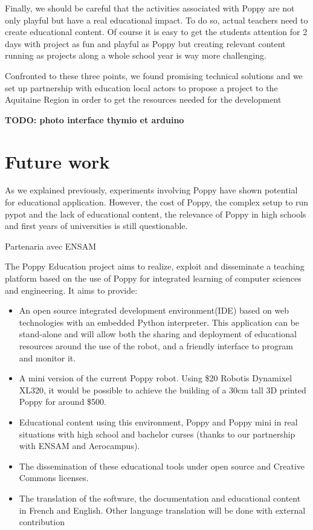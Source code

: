 Finally, we should be careful that the activities associated with Poppy are not only playful but have a real educational impact. To do so, actual teachers need to create educational content. Of course it is easy to get the students attention for 2 days with project as fun and playful as Poppy but creating relevant content running as projects along a whole school year is way more challenging.

Confronted to these three points, we found promising technical solutions and we set up partnership with education local actors to propose a project to the Aquitaine Region in order to get the resources needed for the development

\textbf{TODO: photo interface thymio et arduino}

\section{Future work} %

As we explained previously, experiments involving Poppy have shown potential for educational application. However, the cost of Poppy, the complex setup to run pypot and the lack of educational content, the relevance of Poppy in high schools and first years of universities is still questionable.


Partenaria avec ENSAM

The Poppy Education project aims to realize, exploit and disseminate a teaching platform based on the use of Poppy for integrated learning of computer sciences and engineering. It aims to provide:
\begin{itemize}
    \item An open source integrated development environment(IDE) based on web technologies with an embedded Python interpreter. This application can be stand-alone and will allow both the sharing and deployment of educational resources around the use of the robot, and a friendly interface to program and monitor it.
    \item A mini version of the current Poppy robot. Using \$20 Robotis Dynamixel XL320, it would be possible to achieve the building of a 30cm tall 3D printed Poppy for around \$500.
    \item Educational content using this environment, Poppy and Poppy mini in real situations with high school and bachelor curses (thanks to our partnership with ENSAM and Aerocampus).
    \item The dissemination of these educational tools under open source and Creative Commons licenses.
    \item The translation of the software, the documentation and educational content in French and English. Other language translation will be done with external contribution
\end{itemize}




